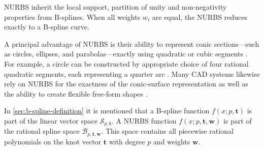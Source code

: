NURBS inherit the local support, partition of unity and non-negativity properties from B-splines. When all weights $w_i$ are equal, the NURBS reduces exactly to a B-spline curve. \citep{Piegl1997}

A principal advantage of NURBS is their ability to represent conic sections---such as circles, ellipses, and parabolas---exactly using quadratic or cubic segments \citep{Piegl1997}. For example, a circle can be constructed by appropriate choice of four rational quadratic segments, each representing a quarter arc \citep{DenbighStarkeyNURBS}. Many CAD systems likewise rely on NURBS for the exactness of the conic-surface representation as well as the ability to create flexible free-form shapes \citep{Farin1991,PieglTillerSIGGRAPH,cottrell2009isogeometric}.

In \cref{sec:b-spline-definition} it is mentioned that a B-spline function $f(x; p, \mathbf t)$ is part of the linear vector space $\mathcal S_{p, \mathbf t}$. A NURBS function $f(x; p, \mathbf t, \mathbf w)$ is part of the rational spline space $\mathcal B_{p, \mathbf t, \mathbf w}$. This space contains all piecewise rational polynomials on the knot vector $\mathbf t$ with degree $p$ and weights $\mathbf w$. 


